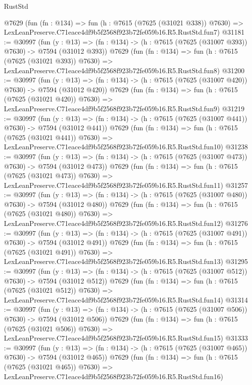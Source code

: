 \begin{lexlean}{RustStd}
\begin{coremodule}
    @7629
    (fun (fn : @134) =>
    fun (h : @7615 (@7625 (@31021 @338)) @7630) =>
    LexLeanPreserve.C71eace4df9b5f2568f923b72fe059b16.R5.RustStd.fun7)
@31181 := @30997
    (fun (y : @13) => (fn : @134) -> (h : @7615 (@7625 (@31007 @393)) @7630) -> @7594 (@31012 @393))
    @7629
    (fun (fn : @134) =>
    fun (h : @7615 (@7625 (@31021 @393)) @7630) =>
    LexLeanPreserve.C71eace4df9b5f2568f923b72fe059b16.R5.RustStd.fun8)
@31200 := @30997
    (fun (y : @13) => (fn : @134) -> (h : @7615 (@7625 (@31007 @420)) @7630) -> @7594 (@31012 @420))
    @7629
    (fun (fn : @134) =>
    fun (h : @7615 (@7625 (@31021 @420)) @7630) =>
    LexLeanPreserve.C71eace4df9b5f2568f923b72fe059b16.R5.RustStd.fun9)
@31219 := @30997
    (fun (y : @13) => (fn : @134) -> (h : @7615 (@7625 (@31007 @441)) @7630) -> @7594 (@31012 @441))
    @7629
    (fun (fn : @134) =>
    fun (h : @7615 (@7625 (@31021 @441)) @7630) =>
    LexLeanPreserve.C71eace4df9b5f2568f923b72fe059b16.R5.RustStd.fun10)
@31238 := @30997
    (fun (y : @13) => (fn : @134) -> (h : @7615 (@7625 (@31007 @473)) @7630) -> @7594 (@31012 @473))
    @7629
    (fun (fn : @134) =>
    fun (h : @7615 (@7625 (@31021 @473)) @7630) =>
    LexLeanPreserve.C71eace4df9b5f2568f923b72fe059b16.R5.RustStd.fun11)
@31257 := @30997
    (fun (y : @13) => (fn : @134) -> (h : @7615 (@7625 (@31007 @480)) @7630) -> @7594 (@31012 @480))
    @7629
    (fun (fn : @134) =>
    fun (h : @7615 (@7625 (@31021 @480)) @7630) =>
    LexLeanPreserve.C71eace4df9b5f2568f923b72fe059b16.R5.RustStd.fun12)
@31276 := @30997
    (fun (y : @13) => (fn : @134) -> (h : @7615 (@7625 (@31007 @491)) @7630) -> @7594 (@31012 @491))
    @7629
    (fun (fn : @134) =>
    fun (h : @7615 (@7625 (@31021 @491)) @7630) =>
    LexLeanPreserve.C71eace4df9b5f2568f923b72fe059b16.R5.RustStd.fun13)
@31295 := @30997
    (fun (y : @13) => (fn : @134) -> (h : @7615 (@7625 (@31007 @512)) @7630) -> @7594 (@31012 @512))
    @7629
    (fun (fn : @134) =>
    fun (h : @7615 (@7625 (@31021 @512)) @7630) =>
    LexLeanPreserve.C71eace4df9b5f2568f923b72fe059b16.R5.RustStd.fun14)
@31314 := @30997
    (fun (y : @13) => (fn : @134) -> (h : @7615 (@7625 (@31007 @506)) @7630) -> @7594 (@31012 @506))
    @7629
    (fun (fn : @134) =>
    fun (h : @7615 (@7625 (@31021 @506)) @7630) =>
    LexLeanPreserve.C71eace4df9b5f2568f923b72fe059b16.R5.RustStd.fun15)
@31333 := @30997
    (fun (y : @13) => (fn : @134) -> (h : @7615 (@7625 (@31007 @465)) @7630) -> @7594 (@31012 @465))
    @7629
    (fun (fn : @134) =>
    fun (h : @7615 (@7625 (@31021 @465)) @7630) =>
    LexLeanPreserve.C71eace4df9b5f2568f923b72fe059b16.R5.RustStd.fun16)

\end{coremodule}
\end{lexlean}
